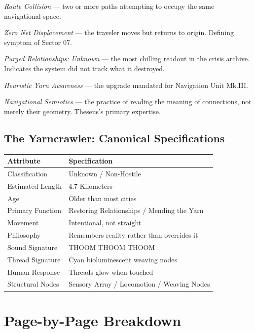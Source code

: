 \documentclass[11pt]{article}
\begin{document}
\textit{Route Collision} --- two or more paths attempting to occupy the same navigational space.

\textit{Zero Net Displacement} --- the traveler moves but returns to origin. Defining symptom of Sector 07.

\textit{Purged Relationships: Unknown} --- the most chilling readout in the crisis archive. Indicates the system did not track what it destroyed.

\textit{Heuristic Yarn Awareness} --- the upgrade mandated for Navigation Unit Mk.III.

\textit{Navigational Semiotics} --- the practice of reading the meaning of connections, not merely their geometry. Theseus's primary expertise.

\subsection{The Yarncrawler: Canonical Specifications}

\begin{center}
\begin{tabular}{ll}
\toprule
\textbf{Attribute} & \textbf{Specification} \\
\midrule
Classification & Unknown / Non-Hostile \\
Estimated Length & 4.7 Kilometers \\
Age & Older than most cities \\
Primary Function & Restoring Relationships / Mending the Yarn \\
Movement & Intentional, not straight \\
Philosophy & Remembers reality rather than overrides it \\
Sound Signature & THOOM THOOM THOOM \\
Thread Signature & Cyan bioluminescent weaving nodes \\
Human Response & Threads glow when touched \\
Structural Nodes & Sensory Array / Locomotion / Weaving Nodes \\
\bottomrule
\end{tabular}
\end{center}

\section{Page-by-Page Breakdown}
\end{document}
